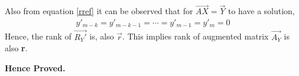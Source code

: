 \documentclass[journal,12pt,twocolumn]{IEEEtran}
\begin{document}
\begin{comment}\myvec{1&a'_{12}&\cdots&a'_{1n}&\vrule&y'_{1} \\0&1&\cdots&a_{2n}&\vrule&y'_{2}\\\vdots&\vdots&\vdots&\vdots&\vrule&\vdots\\0&0&\cdots&0&\vrule&y'_{m-k}\\\vdots&\vdots&\ddots&\vdots&\vrule&\vdots\\0&0&\cdots&0&\vrule&y'_{m-1}\\0&0&\cdots&0&\vrule&y'_{m}}\end{comment}
Also from equation \eqref{rref} it can be observed that for   $\vec{AX}=\vec{Y}$ to have a solution,
\begin{align}
y'_{m-k} = y'_{m-k-1} = \cdots = y'_{m-1} = y'_{m} = 0 
\end{align} 
Hence, the rank of $\vec{R_Y'}$ is, also $\vec{r}$. This implies rank of augmented matrix $\vec{A_Y}$ is also \textbf{r}. \\
\centerline{\textbf{Hence Proved.}}
\end{document}
